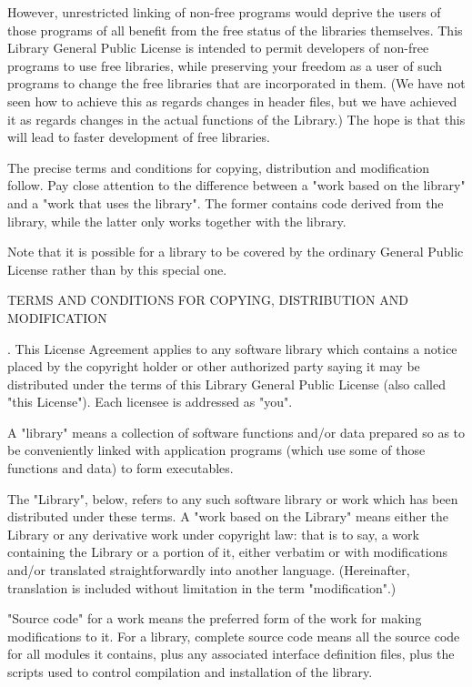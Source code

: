 However, unrestricted linking of non-free programs would deprive the users of those programs of all benefit from the free status of the libraries themselves. This Library General Public License is intended to permit developers of non-free programs to use free libraries, while preserving your freedom as a user of such programs to change the free libraries that are incorporated in them. (We have not seen how to achieve this as regards changes in header files, but we have achieved it as regards changes in the actual functions of the Library.) The hope is that this will lead to faster development of free libraries. 

The precise terms and conditions for copying, distribution and modification follow. Pay close attention to the difference between a "work based on the library" and a "work that uses the library". The former contains code derived from the library, while the latter only works together with the library. 

Note that it is possible for a library to be covered by the ordinary General Public License rather than by this special one. 

\vparasmall
TERMS AND CONDITIONS FOR COPYING, DISTRIBUTION AND MODIFICATION

. This License Agreement applies to any software library which contains a notice placed by the copyright holder or other authorized party saying it may be distributed under the terms of this Library General Public License (also called "this License"). Each licensee is addressed as "you". 

A "library" means a collection of software functions and/or data prepared so as to be conveniently linked with application programs (which use some of those functions and data) to form executables. 

The "Library", below, refers to any such software library or work which has been distributed under these terms. A "work based on the Library" means either the Library or any derivative work under copyright law: that is to say, a work containing the Library or a portion of it, either verbatim or with modifications and/or translated straightforwardly into another language. (Hereinafter, translation is included without limitation in the term "modification".) 

"Source code" for a work means the preferred form of the work for making modifications to it. For a library, complete source code means all the source code for all modules it contains, plus any associated interface definition files, plus the scripts used to control compilation and installation of the library. 

